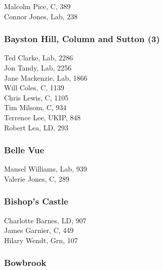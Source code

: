\documentclass[a4paper,openany,10pt]{book}
\begin{document}


Malcolm Pice, C, 389\\
Connor Jones, Lab, 238\\


\subsubsection*{Bayston Hill, Column and Sutton (3)}



Ted Clarke, Lab, 2286\\
Jon Tandy, Lab, 2256\\
Jane Mackenzie, Lab, 1866\\
Will Coles, C, 1139\\
Chris Lewis, C, 1105\\
Tim Milsom, C, 934\\
Terrence Lee, UKIP, 848\\
Robert Lea, LD, 293\\


\subsubsection*{Belle Vue}



Mansel Williams, Lab, 939\\
Valerie Jones, C, 289\\


\subsubsection*{Bishop's Castle}



Charlotte Barnes, LD, 907\\
James Garnier, C, 449\\
Hilary Wendt, Grn, 107\\


\subsubsection*{Bowbrook}

\end{document}
